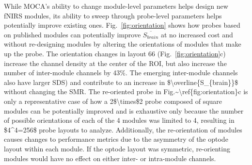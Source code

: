 While \ac{MOCA}'s ability to change module-level parameters helps design new \ac{fNIRS} modules, its ability to sweep through probe-level parameters helps potentially improve existing ones. Fig.~\ref{fig:orientation} shows how probes based on published modules can potentially improve $\overline{S_{brain}}$ at no increased cost and without re-designing modules by altering the orientations of modules that make up the probe. The orientation changes in layout 66 (Fig.~\ref{fig:orientation}c) increase the channel density at the center of the \ac{ROI}, but also increase the number of inter-module channels by 43\%. The emerging inter-module channels also have larger \ac{SDS) and contribute to an increase in $\overline{S_{brain}}$ without changing the SMR. The re-oriented probe in Fig.~\ref{fig:orientation}c is only a representative case of how a 2$\times$2 probe composed of square modules can be potentially improved and is exhaustive only because the number of possible orientations of each of the 4 modules was limited to 4, resulting in $4^4=256$ probe layouts to analyze. Additionally, the re-orientation of modules causes changes to performance metrics due to the asymmetry of the optode layout within each module. If the optode layout was symmetric, re-orienting modules would have no effect on either inter- or intra-module channels. 

}
